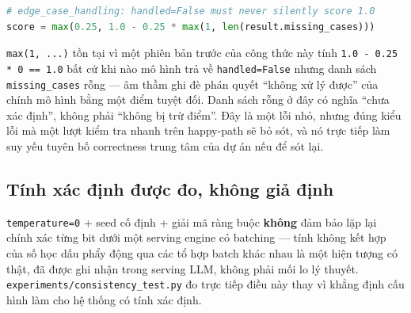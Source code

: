 \documentclass[11pt,a4paper]{article}
\begin{document}
\begin{lstlisting}[language=Python]
# edge_case_handling: handled=False must never silently score 1.0
score = max(0.25, 1.0 - 0.25 * max(1, len(result.missing_cases)))
\end{lstlisting}

\texttt{max(1, ...)} tồn tại vì một phiên bản trước của công thức này tính
\texttt{1.0 - 0.25 * 0 == 1.0} bất cứ khi nào mô hình trả về
\texttt{handled=False} nhưng danh sách \texttt{missing\_cases} rỗng —
âm thầm ghi đè phán quyết ``không xử lý được'' của chính mô hình bằng một
điểm tuyệt đối. Danh sách rỗng ở đây có nghĩa ``chưa xác định'', không
phải ``không bị trừ điểm''. Đây là một lỗi nhỏ, nhưng đúng kiểu lỗi mà một
lượt kiểm tra nhanh trên happy-path sẽ bỏ sót, và nó trực tiếp làm suy yếu
tuyên bố correctness trung tâm của dự án nếu để sót lại.

\subsection{Tính xác định được đo, không giả định}

\texttt{temperature=0} + seed cố định + giải mã ràng buộc \textbf{không}
đảm bảo lặp lại chính xác từng bit dưới một serving engine có batching —
tính không kết hợp của số học dấu phẩy động qua các tổ hợp batch khác nhau
là một hiện tượng có thật, đã được ghi nhận trong serving LLM, không phải
mối lo lý thuyết. \texttt{experiments/consistency\_test.py} đo trực tiếp
điều này thay vì khẳng định cấu hình làm cho hệ thống có tính xác định.
\end{document}
